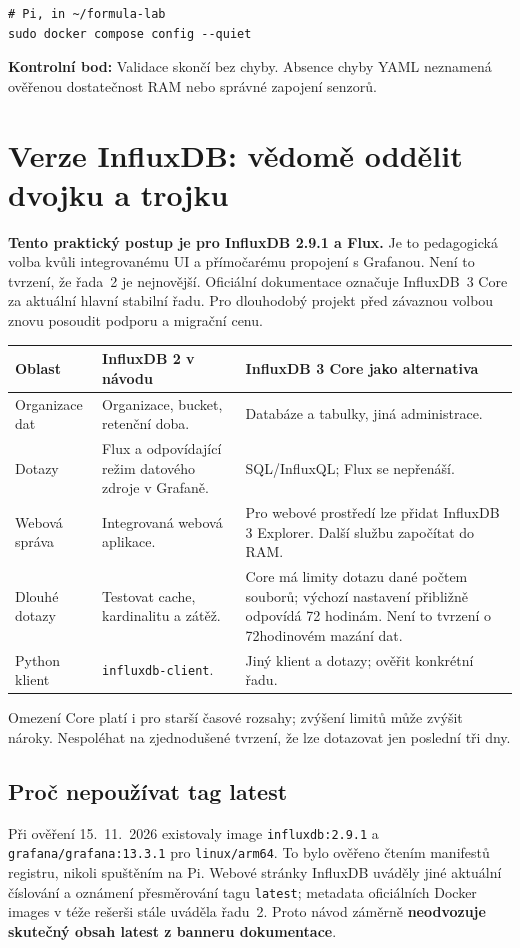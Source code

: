 \documentclass[11pt,a4paper]{article}
\newcommand{\kontrola}[1]{\par\noindent\textbf{Kontrolní bod:} #1\par}
\begin{document}
\begin{lstlisting}
# Pi, in ~/formula-lab
sudo docker compose config --quiet
\end{lstlisting}
\kontrola{Validace skončí bez chyby. Absence chyby YAML neznamená ověřenou dostatečnost RAM nebo správné zapojení senzorů.}

\clearpage
\section{Verze InfluxDB: vědomě oddělit dvojku a trojku}
\textbf{Tento praktický postup je pro InfluxDB 2.9.1 a Flux.} Je to pedagogická volba kvůli integrovanému UI a přímočarému propojení s Grafanou. Není to tvrzení, že řada~2 je nejnovější. Oficiální dokumentace označuje InfluxDB~3 Core za aktuální hlavní stabilní řadu. Pro dlouhodobý projekt před závaznou volbou znovu posoudit podporu a migrační cenu.\cite{influx-install,influx3}

\par\noindent\begin{tabularx}{\textwidth}{L{30mm}Y Y}
\toprule Oblast & InfluxDB 2 v návodu & InfluxDB 3 Core jako alternativa\\\midrule
Organizace dat & Organizace, bucket, retenční doba. & Databáze a tabulky, jiná administrace.\\\addlinespace
Dotazy & Flux a odpovídající režim datového zdroje v Grafaně. & SQL/InfluxQL; Flux se nepřenáší.\\\addlinespace
Webová správa & Integrovaná webová aplikace. & Pro webové prostředí lze přidat InfluxDB 3 Explorer. Další službu započítat do RAM.\\\addlinespace
Dlouhé dotazy & Testovat cache, kardinalitu a zátěž. & Core má limity dotazu dané počtem souborů; výchozí nastavení přibližně odpovídá 72 hodinám. Není to tvrzení o 72hodinovém mazání dat.\\\addlinespace
Python klient & \texttt{influxdb-client}. & Jiný klient a dotazy; ověřit konkrétní řadu.\\
\bottomrule\end{tabularx}\par
Omezení Core platí i pro starší časové rozsahy; zvýšení limitů může zvýšit nároky. Nespoléhat na zjednodušené tvrzení, že lze dotazovat jen poslední tři dny.\cite{influx3-query,influx3-config}

\subsection{Proč nepoužívat tag latest}
Při ověření 15.~11.~2026 existovaly image \texttt{influxdb:2.9.1} a \texttt{grafana/grafana:13.3.1} pro \texttt{linux/arm64}. To bylo ověřeno čtením manifestů registru, nikoli spuštěním na Pi. Webové stránky InfluxDB uváděly jiné aktuální číslování a oznámení přesměrování tagu \texttt{latest}; metadata oficiálních Docker images v téže rešerši stále uváděla řadu~2. Proto návod záměrně \textbf{neodvozuje skutečný obsah latest z banneru dokumentace}.\cite{official-influx,dockerfiles}
\end{document}
